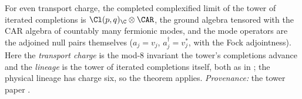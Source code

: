 For even transport charge, the completed complexified limit of the tower of iterated completions is $\Cl(p,q)_\C \otimes \CAR$, the ground algebra tensored with the CAR algebra of countably many fermionic modes, and the mode operators are the adjoined null pairs themselves ($a_j = v_j$, $a_j^\dagger = v_j^*$, with the Fock adjointness). Here the \emph{transport charge} is the mod-8 invariant the tower's completions advance and the \emph{lineage} is the tower of iterated completions itself, both as in \cite{ButlerT3}; the physical lineage has charge six, so the theorem applies. \emph{Provenance:} the tower paper \cite[Prop.~4.1, Thms.~5.3 and 5.6]{ButlerT3}.
